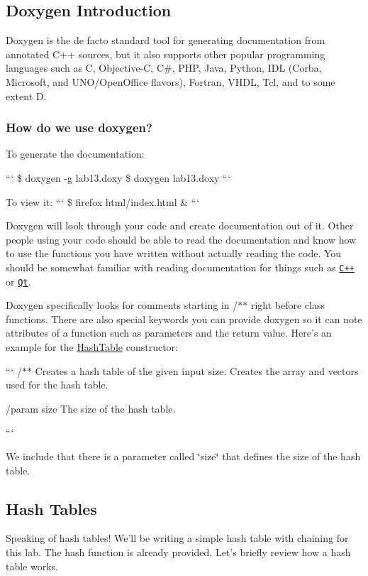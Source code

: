 \subsection*{Doxygen Introduction}

Doxygen is the de facto standard tool for generating documentation from annotated C++ sources, but it also supports other popular programming languages such as C, Objective-\/\-C, C\#, P\-H\-P, Java, Python, I\-D\-L (Corba, Microsoft, and U\-N\-O/\-Open\-Office flavors), Fortran, V\-H\-D\-L, Tcl, and to some extent D.

\subsubsection*{How do we use doxygen?}

To generate the documentation\-:

``` \$ doxygen -\/g lab13.\-doxy \$ doxygen lab13.\-doxy ```

To view it\-: ``` \$ firefox html/index.\-html \& ```

Doxygen will look through your code and create documentation out of it. Other people using your code should be able to read the documentation and know how to use the functions you have written without actually reading the code. You should be somewhat familiar with reading documentation for things such as \href{http://www.cplusplus.com/}{\tt C++} or \href{http://doc.qt.io/qt-5/reference-overview.html}{\tt Qt}.

Doxygen specifically looks for comments starting in {\ttfamily /$\ast$$\ast$} right before class functions. There are also special keywords you can provide doxygen so it can note attributes of a function such as parameters and the return value. Here's an example for the \hyperlink{classHashTable}{Hash\-Table} constructor\-:

``` /$\ast$$\ast$ Creates a hash table of the given input size. Creates the array and vectors used for the hash table.

/param size The size of the hash table.

```

We include that there is a parameter called \char`\"{}size\char`\"{} that defines the size of the hash table.

\subsection*{Hash Tables}

Speaking of hash tables! We'll be writing a simple hash table with chaining for this lab. The hash function is already provided. Let's briefly review how a hash table works.

